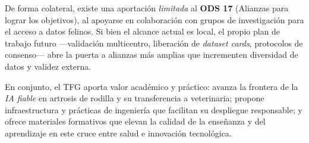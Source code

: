 De forma colateral, existe una aportación \emph{limitada} al \textbf{ODS 17} (Alianzas para lograr los objetivos), al apoyarse en colaboración con grupos de investigación para el acceso a datos felinos. Si bien el alcance actual es local, el propio plan de trabajo futuro —validación multicentro, liberación de \emph{dataset cards}, protocolos de consenso— abre la puerta a alianzas más amplias que incrementen diversidad de datos y validez externa.

En conjunto, el TFG aporta valor académico y práctico: avanza la frontera de la \emph{IA fiable} en artrosis de rodilla y su transferencia a veterinaria; propone infraestructura y prácticas de ingeniería que facilitan su despliegue responsable; y ofrece materiales formativos que elevan la calidad de la enseñanza y del aprendizaje en este cruce entre salud e innovación tecnológica.

